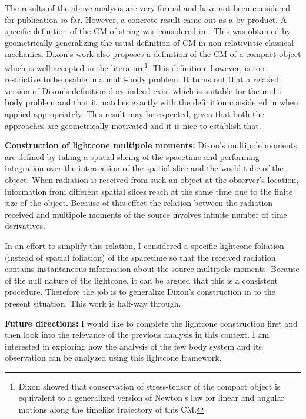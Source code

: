 \documentclass[
article,12pt]{article}
\begin{document}
The results of the above analysis are very formal and have not been considered for publication so far. However, a concrete result came out as a by-product. A specific definition of the CM of string was considered in \cite{semi-classical}. This was obtained by geometrically generalizing the usual definition of CM in non-relativistic classical mechanics. Dixon's work also proposes a definition of the CM of a compact object which is well-accepted in the literature\footnote{Dixon showed \cite{dixon-rev} that conservation of stress-tensor of the compact object is equivalent to a generalized version of Newton's law for linear and angular motions along the timelike trajectory of this CM.}. This definition, however, is too restrictive to be usable in a multi-body problem. It turns out that a relaxed version of Dixon's definition does indeed exist which is suitable for the multi-body problem and that it matches exactly with the definition considered in \cite{semi-classical} when applied appropriately. This result may be expected, given that both the approaches are geometrically motivated and it is nice to establish that.

\noindent
{\bf Construction of lightcone multipole moments:} Dixon's multipole moments are defined by taking a spatial slicing of the spacetime and performing integration over the intersection of the spatial slice and the world-tube of the object. When radiation is received from such an object at the observer's location, information from different spatial slices reach at the same time  due to the finite size of the object. Because of this effect the relation between the radiation received and multipole moments of the source involves infinite number of time derivatives. 

In an effort to simplify this relation, I considered a specific lightcone foliation (instead of spatial foliation) of the spacetime so that the received radiation contains instantaneous information about the source multipole moments. Because of the null nature of the lightcone, it can be argued that this is a consistent procedure. Therefore the job is to generalize Dixon's construction in \cite{dixon-rev} to the present situation. This work is half-way through. 

\vspace{.1in}
\noindent
{\bf Future directions:} I would like to complete the lightcone construction first and then look into the relevance of the previous analysis in this context. I am interested in exploring how the analysis of the few body system and its observation can be analyzed using this lightcone framework. 
\end{document}
